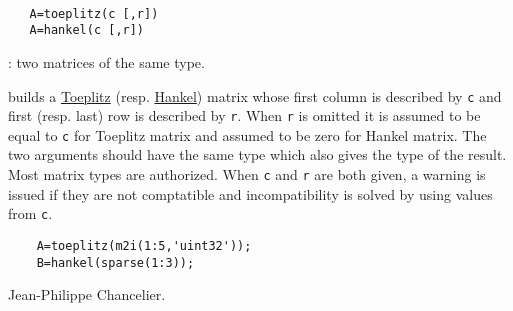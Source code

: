 \begin{mandesc}
  \\ %
\end{mandesc}
\begin{calling_sequence}
\begin{verbatim}
   A=toeplitz(c [,r])   
   A=hankel(c [,r])   
\end{verbatim}
\end{calling_sequence}
\begin{parameters}
  \begin{varlist}
    : two matrices of the same type. 
  \end{varlist}
\end{parameters}
\begin{mandescription}
  builds a \href{http://en.wikipedia.org/wiki/Toeplitz_matrix}{Toeplitz}
  (resp. \href{http://en.wikipedia.org/wiki/Hankel_matrix}{Hankel})
  matrix whose first column is described 
  by \verb+c+ and first (resp. last) row is described by \verb+r+. 
  When \verb+r+ is omitted it is assumed to be equal to \verb+c+ for Toeplitz
  matrix and assumed to be zero for Hankel matrix. 
  The two arguments should have the same type which also gives the type of 
  the result. Most matrix types are authorized. 
  When \verb+c+ and \verb+r+ are both given, a warning is issued if they are 
  not comptatible and incompatibility is solved by using values from \verb+c+. 
\end{mandescription}
\begin{examples}
  \begin{Verbatim}
    A=toeplitz(m2i(1:5,'uint32'));
    B=hankel(sparse(1:3));
  \end{Verbatim}
\end{examples}
\begin{authors}
  Jean-Philippe Chancelier. 
\end{authors}

